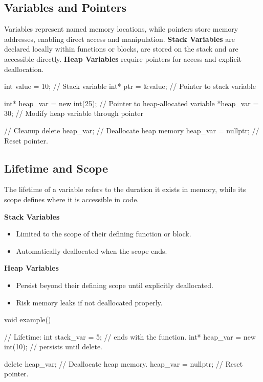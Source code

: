 \subsection{Variables and Pointers}

Variables represent named memory locations, while pointers store memory addresses, enabling direct access and manipulation.
\textbf{Stack Variables} are declared locally within functions or blocks, are stored on the stack and are accessible directly.
\textbf{Heap Variables} require pointers for access and explicit deallocation.

\begin{exampleblock}
    \begin{codeblock}[language=C++]
int value = 10;       // Stack variable
int* ptr = &value;    // Pointer to stack variable

int* heap_var = new int(25); // Pointer to heap-allocated variable
*heap_var = 30;       // Modify heap variable through pointer

// Cleanup
delete heap_var;      // Deallocate heap memory
heap_var = nullptr;   // Reset pointer.
    \end{codeblock}
\end{exampleblock}

\subsection{Lifetime and Scope}

The lifetime of a variable refers to the duration it exists in memory, while its scope defines where it is accessible in code.

\textbf{Stack Variables}
\begin{itemize}
    \item Limited to the scope of their defining function or block.
    \item Automatically deallocated when the scope ends.
\end{itemize}

\textbf{Heap Variables}
\begin{itemize}
    \item Persist beyond their defining scope until explicitly deallocated.
    \item Risk memory leaks if not deallocated properly.
\end{itemize}

\begin{exampleblock}
    \begin{codeblock}[language=C++]
void example() {                  //        Lifetime:
    int stack_var = 5;            // ends with the function.
    int* heap_var = new int(10);  // persists until delete.

    delete heap_var;              // Deallocate heap memory.
    heap_var = nullptr;           // Reset pointer.
}
    \end{codeblock}
\end{exampleblock}

